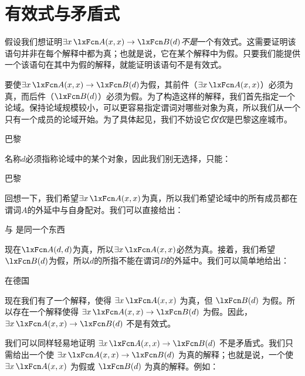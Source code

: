 \section{有效式与矛盾式}
假设我们想证明$\exists x\, \atom{A}{x,x} \eif \atom{B}{d}$\emph{不是}一个有效式。这需要证明该语句并非在每个解释中都为真；也就是说，它在某个解释中为假。只要我们能提供一个该语句在其中为假的解释，就能证明该语句不是有效式。

要使$\exists x\,\atom{A}{x,x} \eif \atom{B}{d}$为假，其前件（$\exists x\, \atom{A}{x,x}$）必须为真，而后件（$\atom{B}{d}$）必须为假。为了构造这样的解释，我们首先指定一个论域。保持论域规模较小，可以更容易指定谓词对哪些对象为真，所以我们从一个只有一个成员的论域开始。为了具体起见，我们不妨设它\emph{仅仅}是巴黎这座城市。


\begin{ekey}
		\item[\text{论域}] 巴黎
	\end{ekey}


名称$d$必须指称论域中的某个对象，因此我们别无选择，只能：


\begin{ekey}
		\item[d] 巴黎
	\end{ekey}


回想一下，我们希望$\exists x\, \atom{A}{x,x}$为真，所以我们希望论域中的所有成员都在谓词$A$的外延中与自身配对。我们可以直接给出：


\begin{ekey}
		\item[\atom{A}{x,y}]  与  是同一个东西
	\end{ekey}


现在$\atom{A}{d,d}$为真，所以$\exists x\, \atom{A}{x,x}$必然为真。接着，我们希望$\atom{B}{d}$为假，所以$d$的所指不能在谓词$B$的外延中。我们可以简单地给出：


\begin{ekey}
		\item[\atom{B}{x}]  在德国
	\end{ekey}

现在我们有了一个解释，使得 $\exists x\, \atom{A}{x,x}$ 为真，但 $\atom{B}{d}$ 为假。所以存在一个解释使得 $\exists x\, \atom{A}{x,x} \eif \atom{B}{d}$ 为假。因此，$\exists x\, \atom{A}{x,x} \eif \atom{B}{d}$ 不是有效式。

我们可以同样轻易地证明 $\exists x\,\atom{A}{x,x} \eif \atom{B}{d}$ 不是矛盾式。我们只需给出一个使 $\exists x\,\atom{A}{x,x} \eif \atom{B}{d}$ 为真的解释；也就是说，一个使 $\exists x\, \atom{A}{x,x}$ 为假或 $\atom{B}{d}$ 为真的解释。例如：



